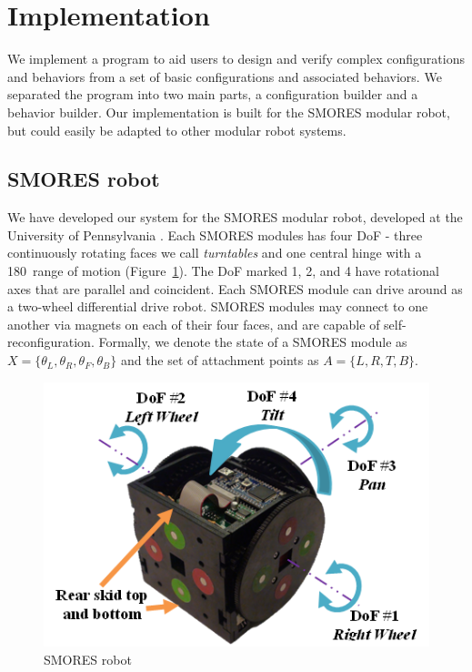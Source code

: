\documentclass[conference]{IEEEtran}
\theoremstyle{definition}
\begin{document}
\section{Implementation }
\label{sec:implementation}
We implement a program to aid users to design and verify complex configurations and behaviors from a set of basic configurations and associated behaviors. We separated the program into two main parts, a configuration builder and a behavior builder.
Our implementation is built for the SMORES modular robot, but could easily be adapted
to other modular robot systems. \subsection{SMORES robot}
We have developed our system for the SMORES modular robot, developed at the
University of Pennsylvania \cite{Davey2012}. Each SMORES modules has four DoF
- three continuously rotating faces we call {\em turntables} and one
central hinge with a 180\textdegree\ range of motion (Figure~\ref{fig:SmoresRobot}). The
DoF marked 1, 2, and 4 have rotational axes that are parallel and coincident.
Each SMORES module can drive around as a two-wheel differential
drive robot.
SMORES modules may connect to one another via magnets on each of their four
faces, and are capable of  self-reconfiguration.
Formally, we denote the state of a SMORES module as \(X=\lbrace \theta_L, \theta_R,
\theta_F, \theta_B \rbrace\) and the set of attachment points as \(A=\lbrace L,R,T,B \rbrace\).




\begin{figure}[tb]
    \begin{center}
        \includegraphics[width=\columnwidth]{images/smores_robot.png}
    \end{center}
    \caption{SMORES robot}
    \label{fig:SmoresRobot}
\end{figure}
\end{document}
